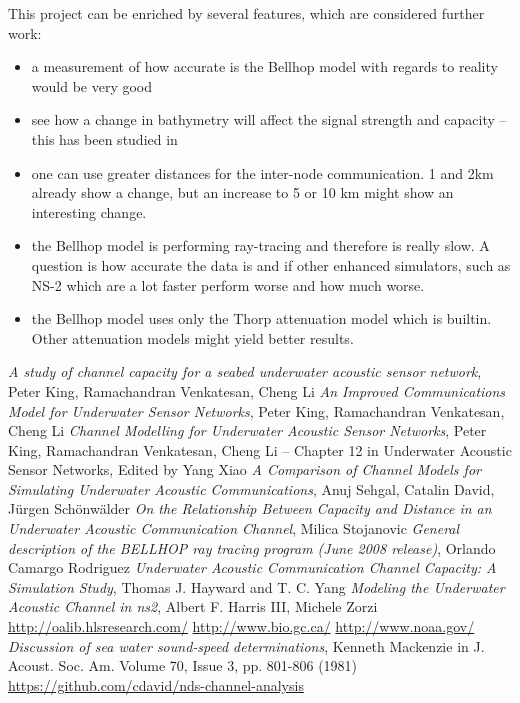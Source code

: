 \documentclass[a4paper]{IEEEtran}
\begin{document}
This project can be enriched by several features, which are considered
further work:
\begin{itemize}
\item a measurement of how accurate is the Bellhop model with regards
  to reality would be very good
\item see how a change in bathymetry will affect the signal strength
  and capacity -- this has been studied in \cite{capacity}
\item one can use greater distances for the inter-node
  communication. 1 and 2km already show a change, but an increase to 5
  or 10 km might show an interesting change.
\item the Bellhop model is performing ray-tracing and therefore is
  really slow. A question is how accurate the data is and if other
  enhanced simulators, such as NS-2 \cite{ns2} which are a lot faster
  perform worse and how much worse.
\item the Bellhop model uses only the Thorp attenuation model which is
  builtin. Other attenuation models might yield better results.
\end{itemize}

\begin{thebibliography}{99}
 \textit{A study of channel capacity for a seabed underwater
acoustic sensor network}, Peter King, Ramachandran Venkatesan, Cheng Li
 \textit{An Improved Communications Model for Underwater Sensor
Networks}, Peter King, Ramachandran Venkatesan, Cheng Li
 \textit{Channel Modelling for Underwater Acoustic Sensor
Networks}, Peter King, Ramachandran Venkatesan, Cheng Li -- Chapter 12 in
Underwater Acoustic Sensor Networks, Edited by Yang Xiao
 \textit{A Comparison of Channel Models for Simulating Underwater
Acoustic Communications}, Anuj Sehgal, Catalin David, J\"urgen Sch\"onw\"alder
 \textit{On the Relationship Between Capacity and Distance
in an Underwater Acoustic Communication Channel}, Milica Stojanovic
 \textit{General description of the BELLHOP ray tracing program
(June 2008 release)}, Orlando Camargo Rodriguez
 \textit{Underwater Acoustic Communication Channel Capacity: A
Simulation Study}, Thomas J. Hayward and T. C. Yang
 \textit{Modeling the Underwater Acoustic Channel in ns2}, Albert
F. Harris III, Michele Zorzi 
 \url{http://oalib.hlsresearch.com/}
 \url{http://www.bio.gc.ca/}
 \url{http://www.noaa.gov/}
 \textit{Discussion of sea water sound‐speed
    determinations}, Kenneth Mackenzie in J. Acoust. Soc. Am. Volume
  70, Issue 3, pp. 801-806 (1981)
 \url{https://github.com/cdavid/nds-channel-analysis}
\end{thebibliography}
\end{document}
